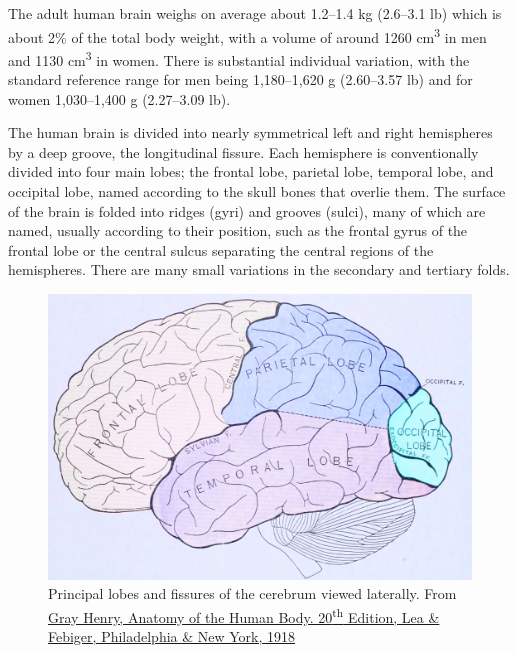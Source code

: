 The adult human brain weighs on average about 1.2--1.4 kg (2.6--3.1 lb) which is about 2\% of the total body weight, with a volume of around 1260 cm\textsuperscript{3} in men and 1130 cm\textsuperscript{3} in women. There is substantial individual variation, with the standard reference range for men being 1,180--1,620 g (2.60--3.57 lb) and for women 1,030--1,400 g (2.27--3.09 lb).

The human brain is divided into nearly symmetrical left and right hemispheres by a deep groove, the longitudinal fissure. Each hemisphere is conventionally divided into four main lobes; the frontal lobe, parietal lobe, temporal lobe, and occipital lobe, named according to the skull bones that overlie them. The surface of the brain is folded into ridges (gyri) and grooves (sulci), many of which are named, usually according to their position, such as the frontal gyrus of the frontal lobe or the central sulcus separating the central regions of the hemispheres. There are many small variations in the secondary and tertiary folds.



\begin{figure}

{\centering \includegraphics[width=0.7\linewidth]{./figures/nervoussystem/GrayAnat1918p821} 

}

\caption{Principal lobes and fissures of the cerebrum viewed laterally. From \href{https://archive.org/details/anatomyofhumanbo1918gray/page/n6/mode/2up}{Gray Henry, Anatomy of the Human Body. 20\textsuperscript{th} Edition, Lea \& Febiger, Philadelphia \& New York, 1918}}\label{fig:principallobes}
\end{figure}



